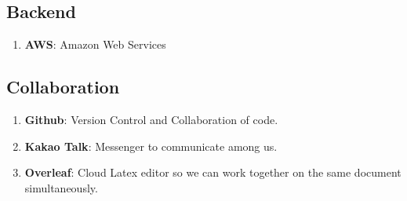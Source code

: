 \documentclass[conference]{IEEEtran}
\numberwithin{figure}{subsection}
\begin{document}
\subsection{Backend}
\begin{enumerate}
 \item \textbf{AWS}: Amazon Web Services
 \newline
\end{enumerate}

\subsection{Collaboration}
\begin{enumerate}
 \item \textbf{Github}: Version Control and Collaboration of code.
 \newline
 \item \textbf{Kakao Talk}: Messenger to communicate among us.
 \newline
 \item \textbf{Overleaf}: Cloud Latex editor so we can work together on the same document simultaneously.
 \newline
\end{enumerate}
\end{document}
